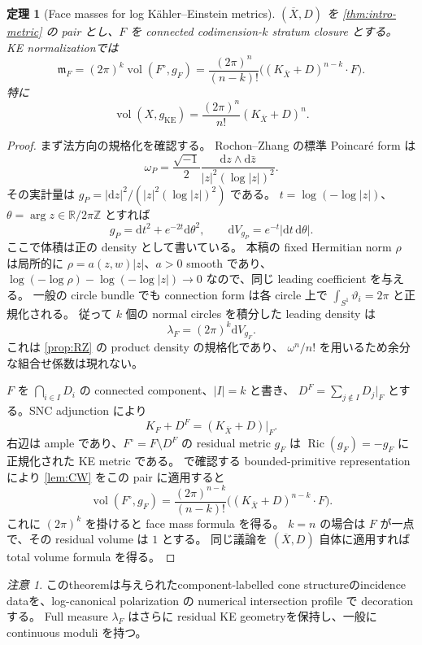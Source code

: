 \documentclass[11pt,a4paper]{ltjsarticle}
\newcommand{\RR}{\mathbb R}
\newcommand{\ZZ}{\mathbb Z}
\newcommand{\dd}{\mathrm d}
\newcommand{\vol}{\operatorname{vol}}
\newcommand{\ov}{\overline}
\theoremstyle{plain}
\newtheorem{theorem}{定理}[section]
\theoremstyle{definition}
\theoremstyle{remark}
\newtheorem{remark}[remark]{注意}
\begin{document}
\begin{theorem}[Face masses for log K\"ahler--Einstein metrics]
\label{thm:facemass}
$(\ov X,D)$ を \cref{thm:intro-metric} の pair とし、$F$ を connected codimension-$k$ stratum closure とする。
KE normalizationでは
\[
 \boxed{
 \mathfrak m_F
 =(2\pi)^k\vol(F^\circ,g_F)
 =\frac{(2\pi)^n}{(n-k)!}\bigl((K_{\ov X}+D)^{n-k}\cdot F\bigr).}
\]
特に
\[
 \vol(X,g_{\mathrm{KE}})=\frac{(2\pi)^n}{n!}(K_{\ov X}+D)^n.
\]
\end{theorem}
\begin{proof}
まず法方向の規格化を確認する。
Rochon--Zhang \cite[Definition~2.10]{RochonZhang} の標準 Poincar\'e form は
\[
 \omega_P=\frac{\sqrt{-1}}2
 \frac{\dd z\wedge\dd\bar z}{|z|^2(\log|z|)^2}.
\]
その実計量は
$g_P=|\dd z|^2/(|z|^2(\log|z|)^2)$ である。
$t=\log(-\log|z|)$、$\theta=\arg z\in\RR/2\pi\ZZ$ とすれば
\[
 g_P=\dd t^2+e^{-2t}\dd\theta^2,
 \qquad \dd V_{g_P}=e^{-t}|\dd t\,\dd\theta|.
\]
ここで体積は正の density として書いている。
本稿の fixed Hermitian norm $\rho$ は局所的に
$\rho=a(z,w)|z|$、$a>0$ smooth であり、
$\log(-\log\rho)-\log(-\log|z|)\to0$ なので、同じ leading coefficient を与える。
一般の circle bundle でも connection form は各 circle 上で
$\int_{S^1}\vartheta_i=2\pi$ と正規化される。
従って $k$ 個の normal circles を積分した leading density は
\[
 \lambda_F=(2\pi)^k\dd V_{g_F}.
\]
これは \cref{prop:RZ} の product density の規格化であり、
$\omega^n/n!$ を用いるため余分な組合せ係数は現れない。

$F$ を $\bigcap_{i\in I}D_i$ の connected component、$|I|=k$ と書き、
$D^F=\sum_{j\notin I}D_j|_F$ とする。SNC adjunction により
\[
 K_F+D^F=(K_{\ov X}+D)|_F.
\]
右辺は ample であり、$F^\circ=F\setminus D^F$ の residual metric $g_F$ は
$\operatorname{Ric}(g_F)=-g_F$ に正規化された KE metric である。
 で確認する bounded-primitive representation により
\cref{lem:CW} をこの pair に適用すると
\[
 \operatorname{vol}(F^\circ,g_F)
 =\frac{(2\pi)^{n-k}}{(n-k)!}
   \bigl((K_{\ov X}+D)^{n-k}\cdot F\bigr).
\]
これに $(2\pi)^k$ を掛けると face mass formula を得る。
$k=n$ の場合は $F$ が一点で、その residual volume は $1$ とする。
同じ議論を $(\ov X,D)$ 自体に適用すれば total volume formula を得る。
\end{proof}

\begin{remark}
このtheoremは与えられたcomponent-labelled cone structureのincidence dataを、log-canonical polarization の numerical intersection profile で decorationする。
Full measure $\lambda_F$ はさらに residual KE geometryを保持し、一般に continuous moduli を持つ。
\end{remark}
\end{document}
